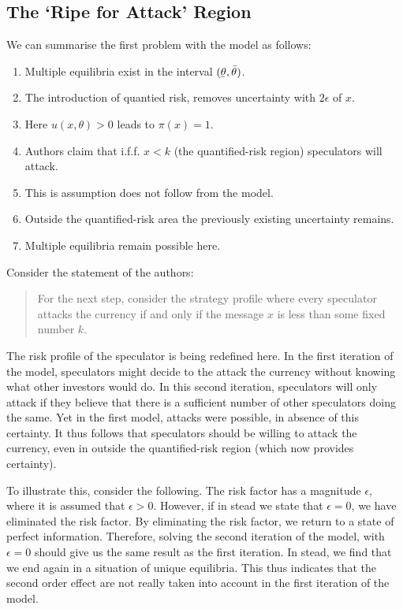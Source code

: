 \begin{refsection}
\subsection{The `Ripe for Attack' Region}
We can summarise the first problem with the model as follows:
\begin{enumerate}
	\item Multiple equilibria exist in the interval $(\underaccent{\bar}{\theta},\bar{\theta})$.
	\item The introduction of quantied risk, removes uncertainty with $2 \epsilon$ of $x$.
	\item Here $u(x,\theta) > 0$ leads to $\pi (x) = 1$.
	\item Authors claim that i.f.f. $x<k$ (the quantified-risk region) speculators will attack. 
	\item This is assumption does not follow from the model.
	\item Outside the quantified-risk area the previously existing uncertainty remains.
	\item Multiple equilibria remain possible here.
\end{enumerate}
Consider the statement of the authors:
\begin{quotation}
	For the next step,
	consider the strategy profile where every speculator attacks the currency if and only if
	the message $x$ is less than some fixed number $k$.
	\parencite[p.~592]{morris1998unique}
\end{quotation}
The risk profile of the speculator is being redefined here.
In the first iteration of the model,
speculators might decide to the attack the currency without knowing what other investors would do.
In this second iteration,
speculators will only attack if they believe that there is a sufficient number of other speculators doing the same.
Yet in the first model, attacks were possible, in absence of this certainty.
It thus follows that speculators should be willing to attack the currency,
even in outside the quantified-risk region (which now provides certainty).

To illustrate this, consider the following. The risk factor has a magnitude $\epsilon$,
where it is assumed that $\epsilon > 0$.
However, if in stead we state that $\epsilon = 0$, we have eliminated the risk factor.
By eliminating the risk factor, we return to a state of perfect information.
Therefore, solving the second iteration of the model, with $\epsilon = 0$ should give us the same result as the first iteration.
In stead, we find that we end again in a situation of unique equilibria.
This thus indicates that the second order effect are not really taken into account in the first iteration of the model.


\end{refsection}
